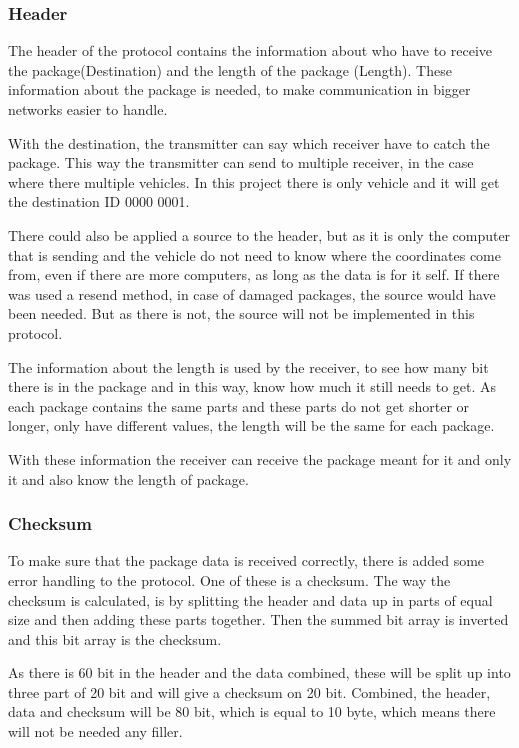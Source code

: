 \subsubsection{Header}
The header of the protocol contains the information about who have to receive the package(Destination) and the length of the package (Length). These information about the package is needed, to make communication in bigger networks easier to handle. 

With the destination, the transmitter can say which receiver have to catch the package. This way the transmitter can send to multiple receiver, in the case where there multiple vehicles. In this project there is only vehicle and it will get the destination ID 0000 0001.

There could also be applied a source to the header, but as it is only the computer that is sending and the vehicle do not need to know where the coordinates come from, even if there are more computers, as long as the data is for it self. If there was used a resend method, in case of damaged packages, the source would have been needed. But as there is not, the source will not be implemented in this protocol.

The information about the length is used by the receiver, to see how many bit there is in the package and in this way, know how much it still needs to get. As each package contains the same parts and these parts do not get shorter or longer, only have different values, the length will be the same for each package.

With these information the receiver can receive the package meant for it and only it and also know the length of package. 

\subsubsection{Checksum}
To make sure that the package data is received correctly, there is added some error handling to the protocol. One of these is a checksum. The way the checksum is calculated, is by splitting the header and data up in parts of equal size and then adding these parts together. Then the summed bit array is inverted and this bit array is the checksum. 

As there is 60 bit in the header and the data combined, these will be split up into three part of 20 bit and will give a checksum on 20 bit. Combined, the header, data and checksum will be 80 bit, which is equal to 10 byte, which means there will not be needed any filler.

